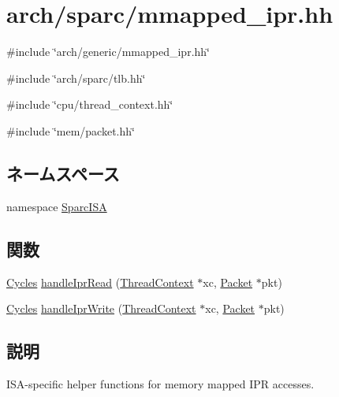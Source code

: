 \hypertarget{sparc_2mmapped__ipr_8hh}{
\section{arch/sparc/mmapped\_\-ipr.hh}
\label{sparc_2mmapped__ipr_8hh}
}
{\ttfamily \#include \char`\"{}arch/generic/mmapped\_\-ipr.hh\char`\"{}}\par
{\ttfamily \#include \char`\"{}arch/sparc/tlb.hh\char`\"{}}\par
{\ttfamily \#include \char`\"{}cpu/thread\_\-context.hh\char`\"{}}\par
{\ttfamily \#include \char`\"{}mem/packet.hh\char`\"{}}\par
\subsection*{ネームスペース}
\begin{DoxyCompactItemize}
\item 
namespace \hyperlink{namespaceSparcISA}{SparcISA}
\end{DoxyCompactItemize}
\subsection*{関数}
\begin{DoxyCompactItemize}
\item 
\hyperlink{classCycles}{Cycles} \hyperlink{namespaceSparcISA_a7ffad0153adc8a171207f50d0fe42349}{handleIprRead} (\hyperlink{classThreadContext}{ThreadContext} $\ast$xc, \hyperlink{classPacket}{Packet} $\ast$pkt)
\item 
\hyperlink{classCycles}{Cycles} \hyperlink{namespaceSparcISA_a57a617c69d03da2039f82d07f711e03e}{handleIprWrite} (\hyperlink{classThreadContext}{ThreadContext} $\ast$xc, \hyperlink{classPacket}{Packet} $\ast$pkt)
\end{DoxyCompactItemize}


\subsection{説明}
ISA-\/specific helper functions for memory mapped IPR accesses. 